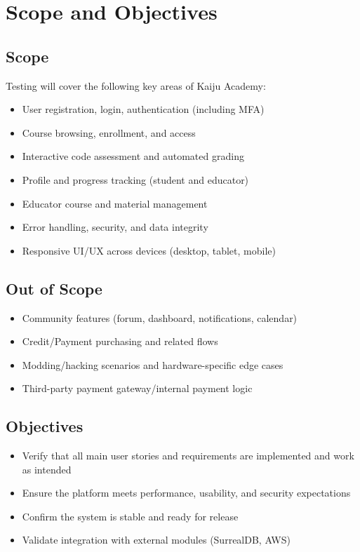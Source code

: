 \documentclass[a4paper,11pt]{scrartcl}
\begin{document}
\section{Scope and Objectives}

\subsection{Scope}
Testing will cover the following key areas of Kaiju Academy:
\begin{itemize}[leftmargin=*]
    \item User registration, login, authentication (including MFA)
    \item Course browsing, enrollment, and access
    \item Interactive code assessment and automated grading
    \item Profile and progress tracking (student and educator)
    \item Educator course and material management
    \item Error handling, security, and data integrity
    \item Responsive UI/UX across devices (desktop, tablet, mobile)
\end{itemize}

\subsection{Out of Scope}
\begin{itemize}[leftmargin=*]
    \item Community features (forum, dashboard, notifications, calendar)
    \item Credit/Payment purchasing and related flows
    \item Modding/hacking scenarios and hardware-specific edge cases
    \item Third-party payment gateway/internal payment logic
\end{itemize}

\subsection{Objectives}
\begin{itemize}[leftmargin=*]
    \item Verify that all main user stories and requirements are implemented and work as intended
    \item Ensure the platform meets performance, usability, and security expectations
    \item Confirm the system is stable and ready for release
    \item Validate integration with external modules (SurrealDB, AWS)
\end{itemize}
\end{document}
